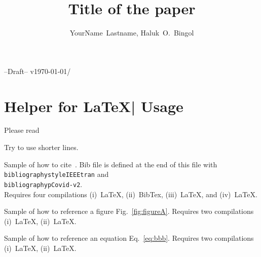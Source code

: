 \documentclass[10pt,journal,compsoc]{IEEEtran}
\newcommand{\hbTimeStamp}{{\color{red}--Draft-- v\today/\currenttime}} %
\theoremstyle{plain}
\theoremstyle{definition}
\theoremstyle{remark}
\newcommand{\reffig}[1]{Fig.~\ref{#1}}
\newcommand{\refeq}[1]{Eq.~\ref{#1}}
\begin{document}
\title{
	Title of the paper
}

\author{
	YourName~Lastname,
	Haluk~O.~Bingol
}


\markboth{
	\hbTimeStamp
}%
{
	\hbTimeStamp
}


\maketitle




\section{Helper for \LaTeX| Usage}

Please read 

Try to use shorter lines.

Sample of how to cite~\cite{%
	chomsky1993,
	wikiComplexNetwork%
	}.
Bib file is defined at the end of this file with\\
\texttt{bibliographystyle{IEEEtran}} and\\
\texttt{bibliography{pCovid-v2}}.\\
Requires four compilations 
(i)~LaTeX, 
(ii)~BibTex, 
(iii)~LaTeX, and  
(iv)~LaTeX.

Sample of how to reference a figure \reffig{fig:figureA}.
Requires two compilations 
(i)~LaTeX, 
(ii)~LaTeX.

Sample of how to reference an equation \refeq{eq:bbb}.
Requires two compilations 
(i)~LaTeX, 
(ii)~LaTeX.
\end{document}
